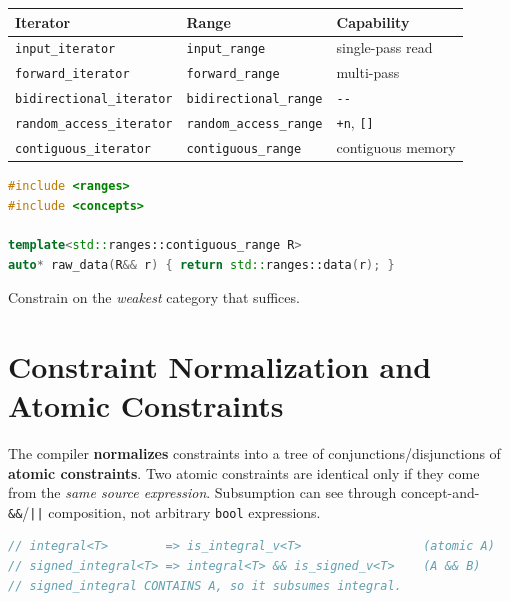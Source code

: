 \begin{center}
\begin{tabular}{lll}
\hline
\textbf{Iterator} & \textbf{Range} & \textbf{Capability} \\
\hline
\texttt{input\_iterator} & \texttt{input\_range} & single-pass read \\
\texttt{forward\_iterator} & \texttt{forward\_range} & multi-pass \\
\texttt{bidirectional\_iterator} & \texttt{bidirectional\_range} & \texttt{-{}-} \\
\texttt{random\_access\_iterator} & \texttt{random\_access\_range} & \texttt{+n}, \texttt{[]} \\
\texttt{contiguous\_iterator} & \texttt{contiguous\_range} & contiguous memory \\
\hline
\end{tabular}
\end{center}

\begin{lstlisting}[language=C++,caption={Constraining an algorithm on the right iterator strength}]
#include <ranges>
#include <concepts>

template<std::ranges::contiguous_range R>
auto* raw_data(R&& r) { return std::ranges::data(r); }
\end{lstlisting}

Constrain on the \emph{weakest} category that suffices.

\section{Constraint Normalization and Atomic Constraints}
\label{sec:c20-normalization}

The compiler \textbf{normalizes} constraints into a tree of conjunctions/disjunctions of \textbf{atomic constraints}. Two atomic constraints are identical only if they come from the \emph{same source expression}. Subsumption can see through concept-and-\texttt{\&\&}/\texttt{||} composition, not arbitrary \texttt{bool} expressions.

\begin{lstlisting}[language=C++,caption={Layering makes integral's atomic constraint appear inside signed\_integral}]
// integral<T>        => is_integral_v<T>                 (atomic A)
// signed_integral<T> => integral<T> && is_signed_v<T>    (A && B)
// signed_integral CONTAINS A, so it subsumes integral.
\end{lstlisting}


